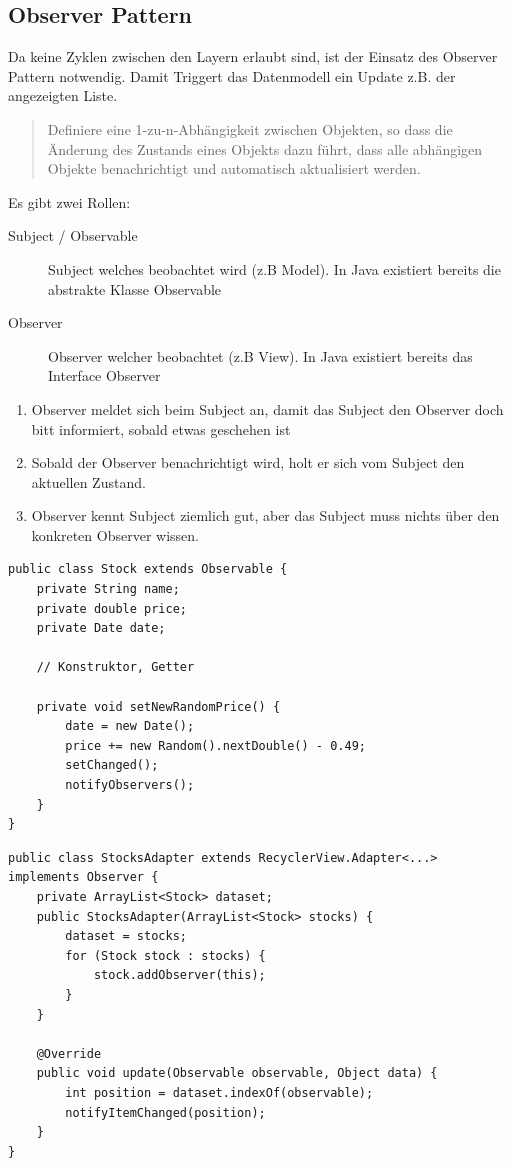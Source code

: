 \subsection{Observer Pattern}
Da keine Zyklen zwischen den Layern erlaubt sind, ist der Einsatz des Observer Pattern notwendig. Damit Triggert das Datenmodell ein Update z.B. der angezeigten Liste.

\begin{quote}
Definiere eine 1-zu-n-Abhängigkeit zwischen Objekten, so dass die Änderung des 
Zustands eines Objekts dazu führt, dass alle abhängigen Objekte benachrichtigt und 
automatisch aktualisiert werden.
\end{quote}

Es gibt zwei Rollen:
\begin{description}
	\item[Subject / Observable] Subject welches beobachtet wird (z.B Model). In Java existiert bereits die abstrakte Klasse Observable
	\item[Observer] Observer welcher beobachtet (z.B View). In Java existiert bereits das Interface Observer
\end{description}

\begin{enumerate}
	\item Observer meldet sich beim Subject an, damit das Subject den Observer doch bitt informiert, sobald etwas geschehen ist
	\item Sobald der Observer benachrichtigt wird, holt er sich vom Subject den aktuellen Zustand. 
	\item Observer kennt Subject ziemlich gut, aber das Subject muss nichts über den konkreten Observer wissen.
\end{enumerate}

\begin{lstlisting}
public class Stock extends Observable {
	private String name;
	private double price;
	private Date date;
	
	// Konstruktor, Getter
	
	private void setNewRandomPrice() {
		date = new Date();
		price += new Random().nextDouble() - 0.49;
		setChanged();
		notifyObservers();
	}
}
\end{lstlisting}

\begin{lstlisting}
public class StocksAdapter extends RecyclerView.Adapter<...> implements Observer {
	private ArrayList<Stock> dataset;
	public StocksAdapter(ArrayList<Stock> stocks) {
		dataset = stocks;
		for (Stock stock : stocks) {
			stock.addObserver(this);
		}
	}
	
	@Override
	public void update(Observable observable, Object data) {
		int position = dataset.indexOf(observable);
		notifyItemChanged(position);
	}
}
\end{lstlisting}


